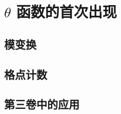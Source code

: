 \section{\texorpdfstring{\(\theta\)}{θ} 函数的首次出现}
\label{b2:sec:0603}


\subsection{模变换}
\label{b2:subsec:060301}

\subsection{格点计数}
\label{b2:subsec:060302}

\subsection{第三卷中的应用}
\label{b2:subsec:060303}


